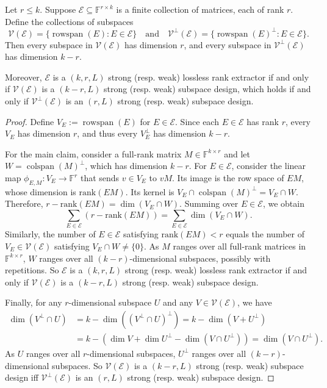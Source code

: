 \documentclass[11pt]{article}
\newcommand{\rank}{\mathrm{rank}}
\newcommand{\F}{\mathbb{F}}
\DeclareMathOperator{\rowspan}{rowspan}
\DeclareMathOperator{\colspan}{colspan}
\begin{document}
\begin{lemma}\label{lem:rc2design}
Let $r\leq k$.
Suppose $\mathcal{E}\subseteq \F^{r\times k}$ is a finite collection of matrices,
each of rank $r$.
Define the collections of subspaces
\[
\mathcal{V}(\mathcal{E})=\{\rowspan(E): E\in\mathcal{E}\}
\quad\text{and}\quad
\mathcal{V}^\perp(\mathcal{E})=\{\rowspan(E)^\perp: E\in\mathcal{E}\}.
\]
Then every subspace in $\mathcal{V}(\mathcal{E})$ has dimension $r$, and every subspace in $\mathcal{V}^\perp(\mathcal{E})$ has dimension $k-r$.

Moreover, $\mathcal{E}$ is a $(k,r,L)$ strong (resp. weak) lossless rank extractor if and only if
$\mathcal{V}(\mathcal{E})$ is a $(k-r,L)$ strong (resp. weak) subspace design, which holds if and only if
$\mathcal{V}^\perp(\mathcal{E})$ is an $(r,L)$ strong (resp. weak) subspace design.
\end{lemma}

\begin{proof}
Define $V_E:=\rowspan(E)$ for $E\in\mathcal E$.
Since each $E\in\mathcal E$ has rank $r$, every $V_E$ has dimension $r$,
and thus every $V_E^\perp$ has dimension $k-r$.

For the main claim, consider a full-rank matrix $M\in\F^{k\times r}$ and let $W=\colspan(M)^\perp$, which has dimension $k-r$.
For $E\in\mathcal E$, consider the linear map $\phi_{E,M}:V_E\to\F^r$ that sends $v\in V_E$ to $vM$. Its image is the row space of $EM$, whose dimension is $\rank(EM)$.
Its kernel is $V_E\cap \colspan(M)^\perp=V_E\cap W$. Therefore, $r-\rank(EM)=\dim(V_E\cap W)$. Summing over $E\in\mathcal{E}$, we obtain
\[
\sum_{E\in\mathcal{E}} (r-\rank(EM))=\sum_{E\in\mathcal{E}} \dim(V_E\cap W).
\]
Similarly, the number of $E\in\mathcal{E}$ satisfying $\rank(EM)<r$ equals the number of $V_E\in\mathcal{V}(\mathcal{E})$ satisfying $V_E\cap W\neq \{0\}$.
As $M$ ranges over all full-rank matrices in $\F^{k\times r}$, $W$ ranges over all $(k-r)$-dimensional subspaces, possibly with repetitions. 
So $\mathcal{E}$ is a $(k,r,L)$ strong (resp. weak) lossless rank extractor if and only if
$\mathcal{V}(\mathcal{E})$ is a $(k-r,L)$ strong (resp. weak) subspace design.

Finally, for any $r$-dimensional subspace $U$ and any $V\in \mathcal V(\mathcal E)$, we have
\begin{align*}
\dim(V^\perp\cap U)&=k-\dim((V^\perp\cap U)^\perp)=k-\dim(V+ U^\perp)\\
&=k-(\dim V+\dim U^\perp-\dim(V\cap U^\perp))
=\dim(V\cap U^\perp).
\end{align*}
As $U$ ranges over all $r$-dimensional subspaces, $U^\perp$ ranges over all $(k-r)$-dimensional subspaces. So $\mathcal{V}(\mathcal{E})$ is a $(k-r,L)$ strong (resp. weak) subspace design iff $\mathcal{V}^\perp(\mathcal{E})$ is an $(r,L)$ strong (resp. weak) subspace design.
\end{proof}
\end{document}
